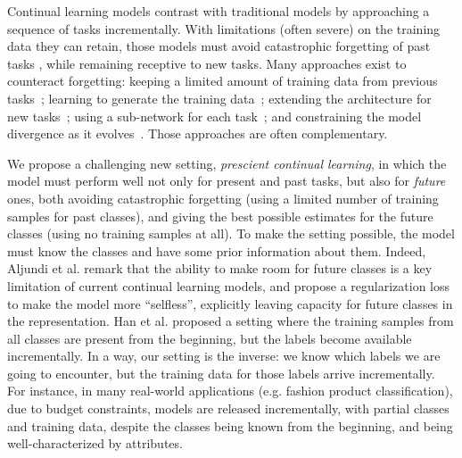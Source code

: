 Continual learning models contrast with traditional models by approaching a sequence of tasks
incrementally. With limitations (often severe) on the training data they can retain, those models
must avoid catastrophic forgetting of past tasks \cite{robins1995catastrophicforgetting,
    french1999catastrophicforgetting}, while remaining receptive to new tasks. Many approaches exist to
counteract forgetting: keeping a limited amount of training data from previous
tasks~\cite{rebuffi2017icarl,castro2018end_to_end_inc_learn}; learning to generate the training
data~\cite{kemker2018fearnet,shin2017deep_generative_replay}; extending the architecture for new
tasks~\cite{yoon2018dynamically_expandable_networks,li2019learning_to_grow}; using a sub-network for
each task~\cite{fernando2017path_net,golkar2019neural_pruning, hung2019cpg}; and constraining the
model divergence as it
evolves~\cite{kirkpatrick2017ewc,lopezpaz2017gem,aljundi2018MemoryAwareSynapses,li2018lwf,rebuffi2017icarl,castro2018end_to_end_inc_learn,
    douillard2020podnet}. Those approaches are often complementary.

We propose a challenging new setting, \textit{prescient continual learning}, in which the model must
perform well not only for present and past tasks, but also for \textit{future} ones, both avoiding
catastrophic forgetting (using a limited number of training samples for past classes), and giving
the best possible estimates for the future classes (using no training samples at all). To make the
setting possible, the model must know the classes and have some prior information about them.
Indeed, Aljundi et al. \cite{aljundi2019selfless} remark that the ability to make room for future
classes is a key limitation of current continual learning models, and propose a regularization loss
to make the model more “selfless”, explicitly leaving capacity for future classes in the
representation. Han et al. \cite{hanrebuffi2020autodiscovering} proposed a setting where the
training samples from all classes are present from the beginning, but the labels become available
incrementally. In a way, our setting is the inverse: we know which labels we are going to encounter,
but the training data for those labels arrive incrementally. For instance, in many real-world
applications (e.g. fashion product classification), due to budget constraints, models are released
incrementally, with partial classes and training data, despite the classes being known from the
beginning, and being well-characterized by attributes.

